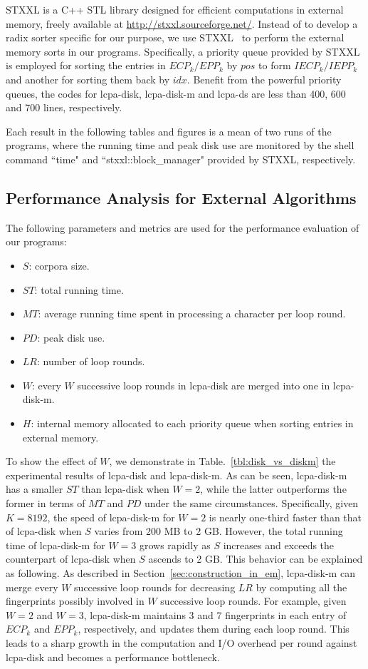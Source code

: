 \documentclass[10pt,journal,compsoc]{IEEEtran}
\begin{document}
\begin{CJK*}{GBK}{song}
STXXL is a {C++} STL library designed for efficient computations in external memory, freely available at \url{http://stxxl.sourceforge.net/}. Instead of to develop a radix sorter specific for our purpose, we use STXXL~\cite{Dementiev2007} to perform the external memory sorts in our programs. Specifically, a priority queue  provided by STXXL is employed for sorting the entries in $ECP_k/EPP_k$ by $pos$ to form $IECP_k/IEPP_k$ and another for sorting them back by $idx$. Benefit from the powerful priority queues, the codes for lcpa-disk, lcpa-disk-m and lcpa-ds are less than 400, 600 and 700 lines, respectively.

Each result in the following tables and figures is a mean of two runs of the programs, where the running time and peak disk use are monitored by the shell command ``time" and ``stxxl::block\_manager" provided by STXXL, respectively.

\subsection{Performance Analysis for External Algorithms}

The following parameters and metrics are used for the performance evaluation of our programs:
\begin{itemize}
\item $S$: corpora size.
\item $ST$: total running time.
\item $MT$: average running time spent in processing a character per loop round.
\item $PD$: peak disk use.
\item $LR$: number of loop rounds.
\item $W$: every $W$ successive loop rounds in lcpa-disk are merged into one in lcpa-disk-m.
\item $H$: internal memory allocated to each priority queue when sorting entries in external memory.
\end{itemize}

To show the effect of $W$, we demonstrate in Table.~\ref{tbl:disk_vs_diskm} the experimental results of lcpa-disk and lcpa-disk-m. As can be seen, lcpa-disk-m has a smaller $ST$ than lcpa-disk when $W=2$, while the latter outperforms the former in terms of $MT$ and $PD$ under the same circumstances. Specifically, given $K=8192$, the speed of lcpa-disk-m for $W=2$ is nearly one-third faster than that of lcpa-disk when $S$ varies from 200 MB to 2 GB. However, the total running time of lcpa-disk-m for $W=3$ grows rapidly as $S$ increases and exceeds the counterpart of lcpa-disk when $S$ ascends to 2 GB. This behavior can be explained as following. As described in Section~\ref{sec:construction_in_em}, lcpa-disk-m can merge every $W$ successive loop rounds for decreasing $LR$ by computing all the fingerprints possibly involved in $W$ successive loop rounds. For example, given $W=2$ and $W=3$, lcpa-disk-m maintains 3 and 7 fingerprints in each entry of $ECP_k$ and $EPP_k$, respectively, and updates them during each loop round. This leads to a sharp growth in the computation and I/O overhead per round against lcpa-disk and becomes a performance bottleneck.


\end{CJK*}
\end{document}
